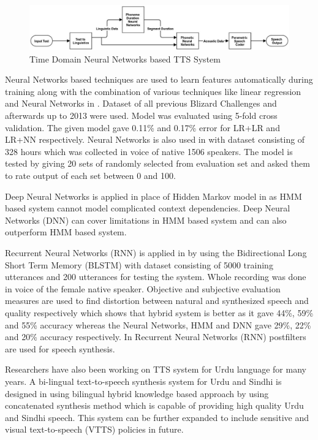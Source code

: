 \begin{center}
	\begin{figure}[hbtp]
		\centering
		\includegraphics[width=\linewidth]{images/time_domain_neural_network.jpg}
		\caption{Time Domain Neural Networks based TTS System}
		\label{fig:Time Domain Neural Networks based TTS System}
	\end{figure}
\end{center}

Neural Networks based techniques are used to learn features automatically during training along with the combination of various techniques 
like linear regression and Neural Networks in \cite{yoshimura2016hierarchical}. Dataset of all previous Blizard Challenges \cite{blizzard_2009_corpus} and
afterwards up to 2013 were used. Model was evaluated using 5-fold cross validation. The given model gave 0.11\% and 0.17\% error for LR+LR and LR+NN 
respectively. Neural Networks is also used in \cite{wu2016merlin} with dataset consisting of 328 hours which was collected in
voice of native 1506 speakers. The model is tested by giving 20 sets of randomly selected from
evaluation set and asked them to rate output of each set between 0 and 100.

Deep Neural Networks is applied in place of Hidden Markov model in \cite{ze2013statistical} as HMM
based system cannot model complicated context dependencies. Deep Neural Networks (DNN) can
cover limitations in HMM based system and can also outperform HMM based system. 

Recurrent Neural Networks (RNN) is applied in \cite{fan2014tts} by using the Bidirectional Long
Short Term Memory (BLSTM) with dataset consisting of 5000 training utterances and 200
utterances for testing the system. Whole recording was done in voice of the female native speaker.
Objective and subjective evaluation measures are used to find distortion between natural and
synthesized speech and quality respectively which shows that hybrid system is better as
it gave 44\%, 59\% and 55\% accuracy whereas the Neural Networks, HMM and DNN gave 29\%,
22\% and 20\% accuracy respectively. In \cite{muthukumar2016recurrent} Recurrent Neural Networks (RNN) postfilters 
are used for speech synthesis. 

Researchers have also been working on TTS system for Urdu language for many years. A bi-lingual text-to-speech synthesis 
system for Urdu and Sindhi is designed in \cite{shah2004bi} using bilingual hybrid knowledge based approach by using concatenated synthesis method which is capable of providing high quality Urdu and Sindhi speech. This system can be further expanded to include sensitive and visual text-to-speech (VTTS) policies in future.

